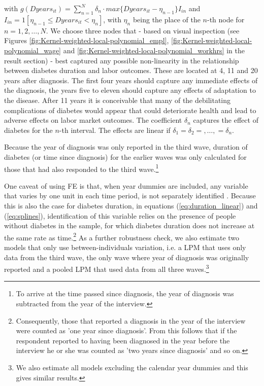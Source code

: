 \documentclass[12pt,english]{article}
\begin{document}
\noindent with $g(Dyears_{it})=\sum_{n=1}^{N}\delta_{n}\cdot max\{Dyears_{it}-\eta_{n-1}\}I_{in}$ and $I_{in}=1[\eta_{n-1}\leq Dyears_{it}<\eta_{n}]$, with $\eta_{n}$ being the place of the $n$-th node for $n=1,2,\ldots,N$. We choose three nodes that - based on visual inspection (see Figures \ref{fig:Kernel-weighted-local-polynomial_empl}, \ref{fig:Kernel-weighted-local-polynomial_wage} and \ref{fig:Kernel-weighted-local-polynomial_workhrs} in the result section) - best captured any possible non-linearity in the
relationship between diabetes duration and labor outcomes. These are located at 4, 11 and 20 years after diagnosis. The
first four years should capture any immediate effects of the diagnosis, the years five to eleven should capture any effects of adaptation to the disease. After 11 years it is conceivable that many of the debilitating complications of diabetes would appear that could deteriorate health and lead to adverse effects on labor market outcomes. The coefficient $\delta_{n}$ captures the effect of diabetes for the $n$-th interval. The effects are linear if $\delta_{1}=\delta_{2}=,\ldots,=\delta_{n}$.

Because the year of diagnosis was only reported in the third wave, duration of diabetes (or time since diagnosis) for the earlier waves was only calculated for those that had also responded to the third wave.\footnote{To arrive at the time passed since diagnosis, the year of diagnosis was subtracted from the year of the interview.}

One caveat of using \ac{FE} is that, when year dummies are included, any variable that varies by one unit in each time period, is not separately identified \parencite{Wooldridge2012}. Because this is also the case for diabetes duration, in equations (\ref{eq:duration_linear}) and (\ref{eq:splines}), identification of this variable relies on the presence of people without diabetes in the sample, for which diabetes duration does not increase at the same rate as time.\footnote{Consequently, those that reported a diagnosis in the year of the interview were counted as 'one year since diagnosis'. From this follows that if the respondent reported to having been diagnosed in the year before the interview he or she was counted as 'two years since diagnosis' and so on.} As a further robustness check, we also estimate two models that only use between-individuals variation, i.e. a \ac{LPM} that uses only data from the third wave, the only wave where year of diagnosis was originally reported and a pooled \ac{LPM} that used data from all three waves.\footnote{We also estimate all models excluding the calendar year dummies and this gives similar results.}
\end{document}
